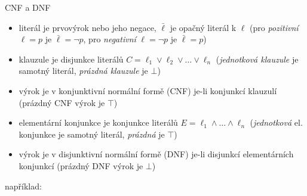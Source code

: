 \documentclass{beamer}
\begin{document}
\begin{frame}{CNF a DNF}

    \pause
    \begin{itemize}[<+->]
        \item \alert{literál} je prvovýrok nebo jeho negace, 
        $\bar \ell$ je \alert{opačný literál} k $\ell$ (pro \emph{pozitivní} $\ell=p$ je $\bar \ell=\neg p$, pro \emph{negativní}  $\ell=\neg p$  je $\bar \ell=p$)
        \item \alert{klauzule} je disjunkce literálů $C=\ell_1\lor\ell_2\lor\dots\lor\ell_n$ 
        (\emph{jednotková klauzule} je samotný literál, \emph{prázdná klauzule} je $\bot$)
        \item výrok je v \alert{konjunktivní normální formě} (\alert{CNF}) je-li konjunkcí klauzulí (prázdný CNF výrok je $\top$)
        \item \alert{elementární konjunkce} je konjunkce literálů $E=\ell_1\land\dots\land\ell_n$ (\emph{jednotková} el. konjunkce je samotný literál,  \emph{prázdná} je $\top$)
        \item výrok je v \alert{disjunktivní normální formě} (\alert{DNF}) je-li disjunkcí elementárních konjunkcí (prázdný DNF výrok je $\bot$)
    \end{itemize}

    \pause
    například:

\end{frame}
\end{document}
